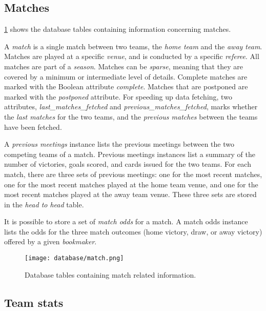 \subsection{Matches}
\label{subsec:database-overview-matches}

\cref{fig:database-matches} shows the database tables containing information concerning matches.

A \textit{match} is a single match between two teams, the \textit{home team} and the \textit{away team}. Matches are played at a specific \textit{venue}, and is conducted by a specific \textit{referee}. All matches are part of a \textit{season}. Matches can be \textit{sparse}, meaning that they are covered by a minimum or intermediate level of details. Complete matches are marked with the Boolean attribute \textit{complete}. Matches that are postponed are marked with the \textit{postponed} attribute. For speeding up data fetching, two attributes, \textit{last\_matches\_fetched} and \textit{previous\_matches\_fetched}, marks whether the \textit{last matches} for the two teams, and the \textit{previous matches} between the teams have been fetched.

A \textit{previous meetings} instance lists the previous meetings between the two competing teams of a match. Previous meetings instances list a summary of the number of victories, goals scored, and cards issued for the two teams. For each match, there are three sets of previous meetings: one for the most recent matches, one for the most recent matches played at the home team venue, and one for the most recent matches played at the away team venue. These three sets are stored in the \textit{head to head} table.

It is possible to store a set of \textit{match odds} for a match. A match odds instance lists the odds for the three match outcomes (home victory, draw, or away victory) offered by a given \textit{bookmaker}.

\begin{figure}
    \centering
    \texttt{[image: database/match.png]}
    \caption{Database tables containing match related information.}
    \label{fig:database-matches}
\end{figure}


\subsection{Team stats}
\label{subsec:database-overview-team-stats}

